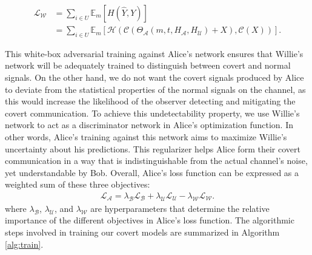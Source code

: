 \begin{equation}
	\begin{aligned} \label{multi_willie_loss}
		\mathcal{L}_{\mathcal{W}} & = 
		\sum_{i \in U} \mathbb{E}_{m}[H(\hat{Y}, Y)] \\
		& = \sum_{i \in U}
			\mathbb{E}_{m}[\mathcal{H}(\mathcal{C}(\Theta_{\mathcal{A}}(m, t, H_{\mathcal{A}}, H_{\mathcal{U}}) + X), \mathcal{C}(X))].
	\end{aligned}
\end{equation}

This white-box adversarial training against Alice's network ensures that Willie's network will be adequately trained to distinguish between covert and normal signals. On the other hand, we do not want the covert signals produced by Alice to deviate from the statistical properties of the normal signals on the channel, as this would increase the likelihood of the observer detecting and mitigating the covert communication. To achieve this undetectability property, we use Willie's network to act as a discriminator network in Alice's optimization function. In other words, Alice's training against this network aims to maximize Willie's uncertainty about his predictions. This regularizer helps Alice form their covert communication in a way that is indistinguishable from the actual channel's noise, yet understandable by Bob. Overall, Alice's loss function can be expressed as a weighted sum of these three objectives:
\begin{equation}
	\begin{array}{l} \label{alice_loss}
	\mathcal{L}_{\mathcal{A}} = \lambda_{\mathcal{B}} \mathcal{L}_{\mathcal{B}} + \lambda_{\mathcal{U}} \mathcal{L}_{\mathcal{U}} - \lambda_{\mathcal{W}} \mathcal{L}_{\mathcal{W}}.
\end{array}
\end{equation}
where \(\lambda_{\mathcal{B}}\), \(\lambda_{\mathcal{U}}\), and \(\lambda_{\mathcal{W}}\) are hyperparameters that determine the relative importance of the different objectives in Alice's loss function. The algorithmic steps involved in training our covert models are summarized in Algorithm \ref{alg:train}.


